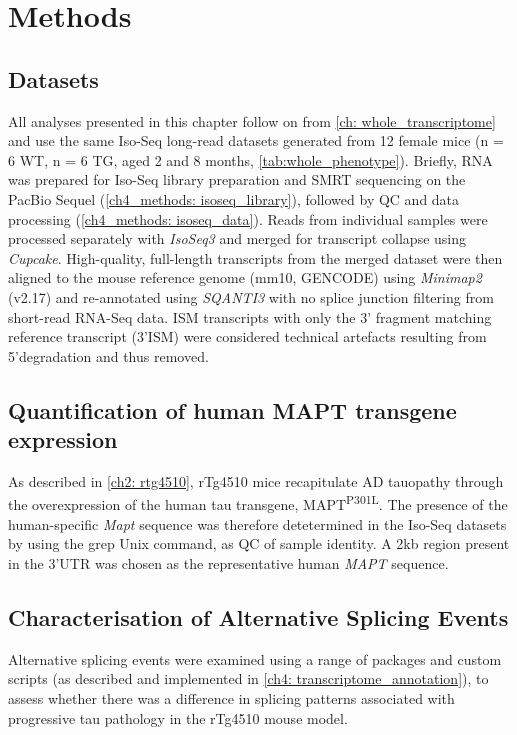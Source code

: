 \newpage
\section{Methods}

\subsection{Datasets}
All analyses presented in this chapter follow on from \cref{ch: whole_transcriptome} and use the same Iso-Seq long-read datasets generated from 12 female mice (n = 6 WT, n = 6 TG, aged 2 and 8 months, \cref{tab:whole_phenotype}). Briefly, RNA was prepared for Iso-Seq library preparation and SMRT sequencing on the PacBio Sequel (\cref{ch4_methods: isoseq_library}), followed by QC and data processing (\cref{ch4_methods: isoseq_data}). Reads from individual samples were processed separately with \textit{IsoSeq3} and merged for transcript collapse using \textit{Cupcake}. High-quality, full-length transcripts from the merged dataset were then aligned to the mouse reference genome (mm10, GENCODE) using \textit{Minimap2} (v2.17) and re-annotated using \textit{SQANTI3} with no splice junction filtering from short-read RNA-Seq data. ISM transcripts with only the 3' fragment matching reference transcript (3'ISM) were considered technical artefacts resulting from 5'degradation and thus removed.  

\subsection{Quantification of human MAPT transgene expression}
\label{ch5: hmapt_quant}
As described in \cref{ch2: rtg4510}, rTg4510 mice recapitulate AD tauopathy through the overexpression of the human tau transgene, MAPT\textsuperscript{P301L}. The presence of the human-specific \textit{Mapt} sequence was therefore detetermined in the Iso-Seq datasets by using the grep Unix command, as QC of sample identity. A 2kb region present in the 3'UTR was chosen as the representative human \textit{MAPT} sequence\cite{Castanho2020}.

\subsection{Characterisation of Alternative Splicing Events} 
Alternative splicing events were examined using a range of packages and custom scripts (as described and implemented in \cref{ch4: transcriptome_annotation}), to assess whether there was a difference in splicing patterns associated with progressive tau pathology in the rTg4510 mouse model. 

